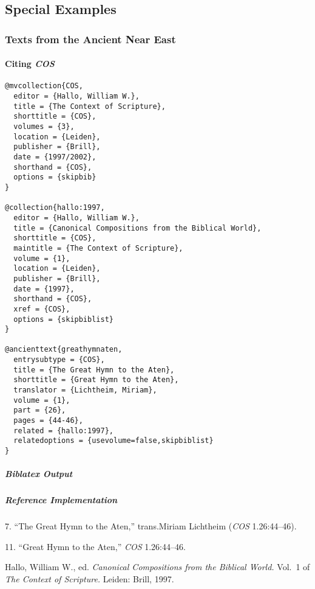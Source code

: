 \documentclass[a4paper]{article}
\newenvironment{biboutput}{%
  \subparagraph{Biblatex Output}
}{\color{black}}
\newenvironment{refimp}{%
  \subparagraph{Reference Implementation}
  \color{reference-colour}
  \rm
}{\par\color{black}}
\begin{document}
\subsection{Special Examples}

\subsubsection{Texts from the Ancient Near East}

\paragraph{Citing \textsl{COS}}

\begin{lstlisting}
@mvcollection{COS,
  editor = {Hallo, William W.},
  title = {The Context of Scripture},
  shorttitle = {COS},
  volumes = {3},
  location = {Leiden},
  publisher = {Brill},
  date = {1997/2002},
  shorthand = {COS},
  options = {skipbib}
}

@collection{hallo:1997,
  editor = {Hallo, William W.},
  title = {Canonical Compositions from the Biblical World},
  shorttitle = {COS},
  maintitle = {The Context of Scripture},
  volume = {1},
  location = {Leiden},
  publisher = {Brill},
  date = {1997},
  shorthand = {COS},
  xref = {COS},
  options = {skipbiblist}
}

@ancienttext{greathymnaten,
  entrysubtype = {COS},
  title = {The Great Hymn to the Aten},
  shorttitle = {Great Hymn to the Aten},
  translator = {Lichtheim, Miriam},
  volume = {1},
  part = {26},
  pages = {44-46},
  related = {hallo:1997},
  relatedoptions = {usevolume=false,skipbiblist}
}
\end{lstlisting}

\begin{biboutput}
\end{biboutput}

\begin{refimp}
  \hspace*{\bibindent}7. “The Great Hymn to the Aten,” trans.\@ Miriam Lichtheim
  (\emph{COS} 1.26:44–46).

  \hspace*{\bibindent}11. “Great Hymn to the Aten,” \emph{COS} 1.26:44–46.

  \hangindent\bibindent Hallo, William W., ed. \emph{Canonical Compositions
  from the Biblical World.} Vol.~1 of \emph{The Context of Scripture.} Leiden:
  Brill, 1997.

\end{refimp}
\end{document}
